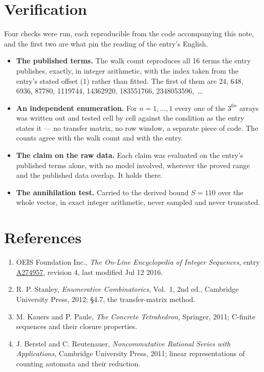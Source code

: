\documentclass[11pt]{article}
\theoremstyle{definition}
\begin{document}
\section{Verification}

Four checks were run, each reproducible from the code accompanying this note, and the first two are what pin the reading of the entry's English.

\begin{itemize}

\item {\bfseries The published terms.} The walk count reproduces all 16 terms the entry publishes, exactly, in integer arithmetic, with the index taken from the entry's stated offset (1) rather than fitted. The first of them are 24, 648, 6936, 87780, 1119744, 14362920, 183551766, 2348053596,~\dots

\item {\bfseries An independent enumeration.} For $n = 1,\dots,1$ every one of the $3^{6n}$ arrays was written out and tested cell by cell against the condition as the entry states it --- no transfer matrix, no row window, a separate piece of code. The counts agree with the walk count and with the entry.

\item {\bfseries The claim on the raw data.} Each claim was evaluated on the entry's published terms alone, with no model involved, wherever the proved range and the published data overlap. It holds there.

\item {\bfseries The annihilation test.} Carried to the derived bound $S = 110$ over the whole vector, in exact integer arithmetic, never sampled and never truncated.

\end{itemize}

\section{References}

\begin{enumerate}

\item OEIS Foundation Inc., \emph{The On-Line Encyclopedia of Integer Sequences}, entry \href{https://oeis.org/A274957}{A274957}, revision 4, last modified Jul 12 2016.

\item R. P. Stanley, \emph{Enumerative Combinatorics}, Vol.~1, 2nd ed., Cambridge University Press, 2012; \S4.7, the transfer-matrix method.

\item M. Kauers and P. Paule, \emph{The Concrete Tetrahedron}, Springer, 2011; C-finite sequences and their closure properties.

\item J. Berstel and C. Reutenauer, \emph{Noncommutative Rational Series with Applications}, Cambridge University Press, 2011; linear representations of counting automata and their reduction.

\end{enumerate}
\end{document}
